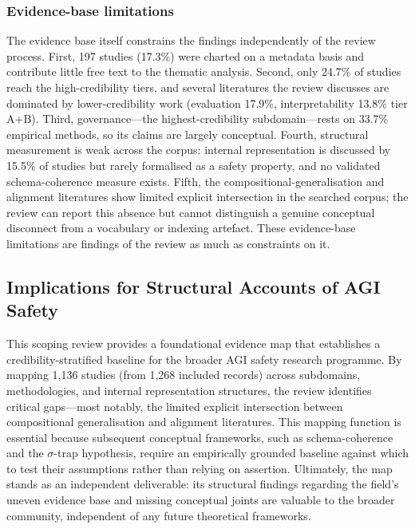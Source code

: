 \subsubsection{Evidence-base limitations}
The evidence base itself constrains the findings independently of the review process. First, 197 studies (17.3\%) were charted on a metadata basis and contribute little free text to the thematic analysis. Second, only 24.7\% of studies reach the high-credibility tiers, and several literatures the review discusses are dominated by lower-credibility work (evaluation 17.9\%, interpretability 13.8\% tier A+B). Third, governance---the highest-credibility subdomain---rests on 33.7\% empirical methods, so its claims are largely conceptual. Fourth, structural measurement is weak across the corpus: internal representation is discussed by 15.5\% of studies but rarely formalised as a safety property, and no validated schema-coherence measure exists. Fifth, the compositional-generalisation and alignment literatures show limited explicit intersection in the searched corpus; the review can report this absence but cannot distinguish a genuine conceptual disconnect from a vocabulary or indexing artefact. These evidence-base limitations are findings of the review as much as constraints on it.

\subsection{Implications for Structural Accounts of AGI Safety}
This scoping review provides a foundational evidence map that establishes a credibility-stratified baseline for the broader AGI safety research programme. By mapping 1,136 studies (from 1,268 included records) across subdomains, methodologies, and internal representation structures, the review identifies critical gaps---most notably, the limited explicit intersection between compositional generalisation and alignment literatures. This mapping function is essential because subsequent conceptual frameworks, such as schema-coherence and the $\sigma$-trap hypothesis, require an empirically grounded baseline against which to test their assumptions rather than relying on assertion. Ultimately, the map stands as an independent deliverable: its structural findings regarding the field's uneven evidence base and missing conceptual joints are valuable to the broader community, independent of any future theoretical frameworks.

